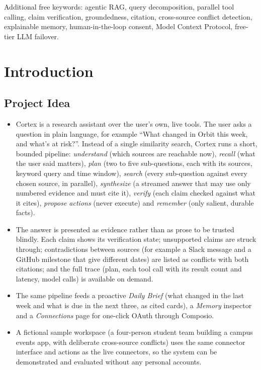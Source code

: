 \documentclass[oneside,a4paper,12pt]{report}
\begin{document}
Additional free keywords: agentic RAG, query decomposition, parallel tool calling, claim verification, groundedness, citation, cross-source conflict detection, explainable memory, human-in-the-loop consent, Model Context Protocol, free-tier LLM failover.


\chapter{Introduction}
\label{ch:intro}
\section{Project Idea}
\begin{itemize}
\item Cortex is a research assistant over the user's own, live tools. The user asks a question in plain language, for example ``What changed in Orbit this week, and what's at risk?''. Instead of a single similarity search, Cortex runs a short, bounded pipeline: \emph{understand} (which sources are reachable now), \emph{recall} (what the user said matters), \emph{plan} (two to five sub-questions, each with its sources, keyword query and time window), \emph{search} (every sub-question against every chosen source, in parallel), \emph{synthesize} (a streamed answer that may use only numbered evidence and must cite it), \emph{verify} (each claim checked against what it cites), \emph{propose actions} (never execute) and \emph{remember} (only salient, durable facts).
\item The answer is presented as evidence rather than as prose to be trusted blindly. Each claim shows its verification state; unsupported claims are struck through; contradictions between sources (for example a Slack message and a GitHub milestone that give different dates) are listed as conflicts with both citations; and the full trace (plan, each tool call with its result count and latency, model calls) is available on demand.
\item The same pipeline feeds a proactive \emph{Daily Brief} (what changed in the last week and what is due in the next three, as cited cards), a \emph{Memory} inspector and a \emph{Connections} page for one-click OAuth through Composio.
\item A fictional sample workspace (a four-person student team building a campus events app, with deliberate cross-source conflicts) uses the same connector interface and actions as the live connectors, so the system can be demonstrated and evaluated without any personal accounts.
\end{itemize}
\end{document}
